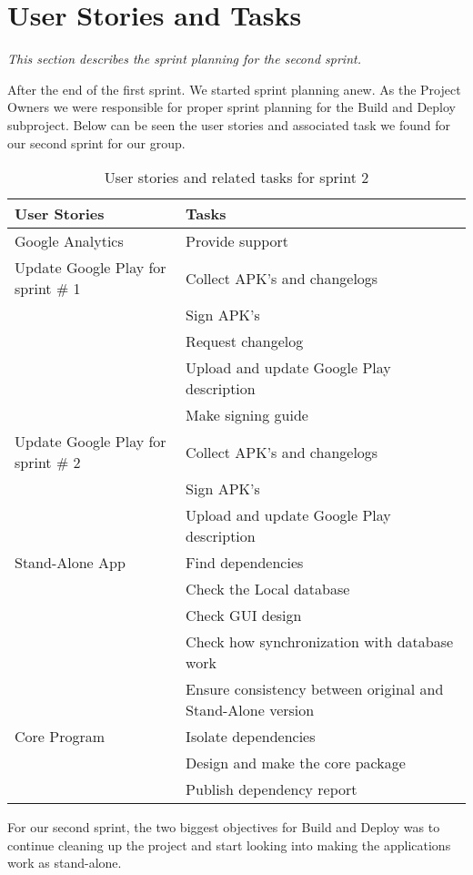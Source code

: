 \section{User Stories and Tasks} \label{Sprint2_SecUserStoriesAndTasks}
\textit{This section describes the sprint planning for the second sprint.}

After the end of the first sprint. We started sprint planning anew. As the Project Owners we were responsible for proper sprint planning for the Build and Deploy subproject. Below can be seen the user stories and associated task we found for our second sprint for our group.

\begin{table}[H]
	\centering
	\begin{tabular}{ll}
		\textbf{User Stories} & \textbf{Tasks}\\ \hline \noalign{\vskip 2mm}
		Google Analytics & Provide support\\ \hline
		Update Google Play for sprint \# 1 & Collect APK's and changelogs\\
		& Sign APK's\\
		& Request changelog\\
		& Upload and update Google Play description\\
		& Make signing guide\\ \hline
		Update Google Play for sprint \# 2 & Collect APK's and changelogs\\
		& Sign APK's\\ 
		& Upload and update Google Play description\\ \hline
		Stand-Alone App & Find dependencies\\
		& Check the Local database\\
		& Check GUI design\\
		& Check how synchronization with database work\\
		& Ensure consistency between original and Stand-Alone version\\ \hline
		Core Program & Isolate dependencies\\
		& Design and make the core package\\
		& Publish dependency report\\
	\end{tabular}
	\caption{User stories and related tasks for sprint 2}
	\label{Sprint2_UserStories2_table}
\end{table}

For our second sprint, the two biggest objectives for Build and Deploy was to continue cleaning up the project and start looking into making the applications work as stand-alone.\\